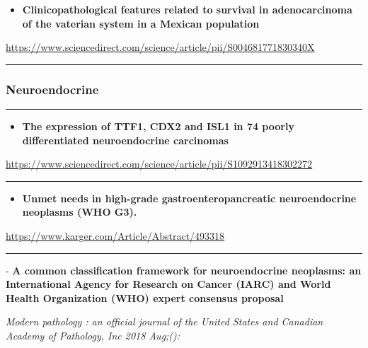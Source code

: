 \documentclass[]{article}
\providecommand{\tightlist}{%
  \setlength{\itemsep}{0pt}\setlength{\parskip}{0pt}}
\begin{document}
\begin{itemize}
\tightlist
\item
  \textbf{Clinicopathological features related to survival in
  adenocarcinoma of the vaterian system in a Mexican population}
\end{itemize}

\url{https://www.sciencedirect.com/science/article/pii/S004681771830340X}

\begin{center}\rule{0.5\linewidth}{\linethickness}\end{center}

\hypertarget{neuroendocrine}{%
\subsubsection{Neuroendocrine}\label{neuroendocrine}}

\begin{center}\rule{0.5\linewidth}{\linethickness}\end{center}

\begin{itemize}
\tightlist
\item
  \textbf{The expression of TTF1, CDX2 and ISL1 in 74 poorly
  differentiated neuroendocrine carcinomas}
\end{itemize}

\url{https://www.sciencedirect.com/science/article/pii/S1092913418302272}

\begin{center}\rule{0.5\linewidth}{\linethickness}\end{center}

\begin{itemize}
\tightlist
\item
  \textbf{Unmet needs in high-grade gastroenteropancreatic
  neuroendocrine neoplasms (WHO G3).}
\end{itemize}

\url{https://www.karger.com/Article/Abstract/493318}

\begin{center}\rule{0.5\linewidth}{\linethickness}\end{center}

 - \textbf{A common classification framework for neuroendocrine
neoplasms: an International Agency for Research on Cancer (IARC) and
World Health Organization (WHO) expert consensus proposal}

\emph{Modern pathology : an official journal of the United States and
Canadian Academy of Pathology, Inc 2018 Aug;():}
\end{document}
